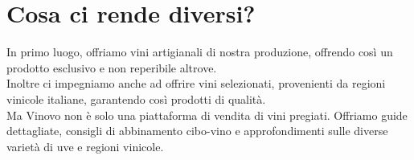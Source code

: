 \documentclass[12pt, a4paper]{article}
\newcommand{\meskip}{\medskip \\}
\begin{document}
\section*{Cosa ci rende diversi?}
In primo luogo, offriamo vini artigianali di nostra produzione, offrendo così un prodotto esclusivo e non reperibile altrove.\\
Inoltre ci impegniamo anche ad offrire vini selezionati, provenienti da regioni vinicole italiane, garantendo così prodotti di qualità.\meskip
Ma Vinovo non è solo una piattaforma di vendita di vini pregiati.
Offriamo guide dettagliate, consigli di abbinamento cibo-vino e approfondimenti sulle diverse varietà di uve e regioni vinicole.
\end{document}
